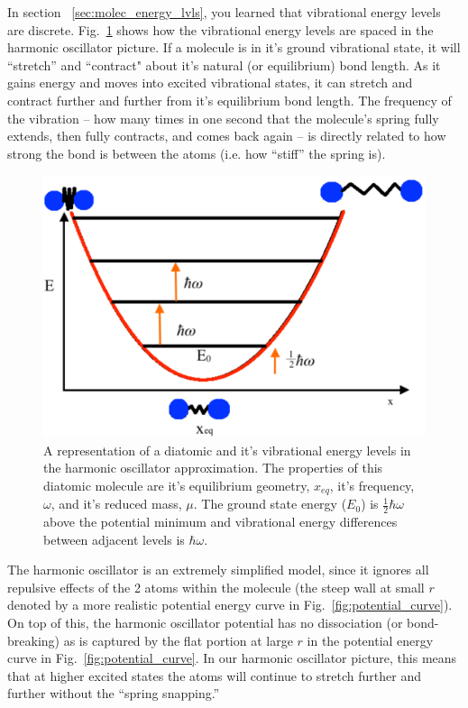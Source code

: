 \documentclass[12pt]{article}
\begin{document}
In section ~\ref{sec:molec_energy_lvls}, you learned that vibrational energy levels are discrete.
Fig.~\ref{fig:harmonic_curve} shows how the vibrational energy levels are spaced in the harmonic oscillator picture. If a molecule is in it's ground vibrational state, it will ``stretch'' and ``contract" about it’s natural (or equilibrium) bond length. As it gains energy and moves into excited vibrational states, it can stretch and contract further and further from it’s equilibrium bond length. The frequency of the vibration -- how many times in one second that the molecule's spring fully extends, then fully contracts, and comes back again -- is directly related to how strong the bond is between the atoms (i.e. how ``stiff'' the spring is).

\begin{figure}
    \begin{center}
        \includegraphics[width=0.4\linewidth]{figures/Harmonic_Oscillator.pdf}
    \end{center}
    \caption{
        A representation of a diatomic and it's vibrational energy levels in the harmonic oscillator approximation. The properties of this diatomic molecule are it's equilibrium geometry, $x_{eq}$, it's frequency, $\omega$, and it's reduced mass, $\mu$. The ground state energy ($E_0$) is $\frac{1}{2}\hbar\omega$ above the potential minimum and vibrational energy differences between adjacent levels is $\hbar\omega$.
    }
    \label{fig:harmonic_curve}
\end{figure}

The harmonic oscillator is an extremely simplified model, since it ignores all repulsive effects of the 2 atoms within the molecule (the steep wall at small $r$ denoted by a more realistic potential energy curve in Fig.~\ref{fig:potential_curve}). On top of this, the harmonic oscillator potential has no dissociation (or bond-breaking) as is captured by the flat portion at large $r$ in the potential energy curve in Fig.~\ref{fig:potential_curve}. In our harmonic oscillator picture, this means that at higher excited states the atoms will continue to stretch further and further without the ``spring snapping.''
\end{document}
